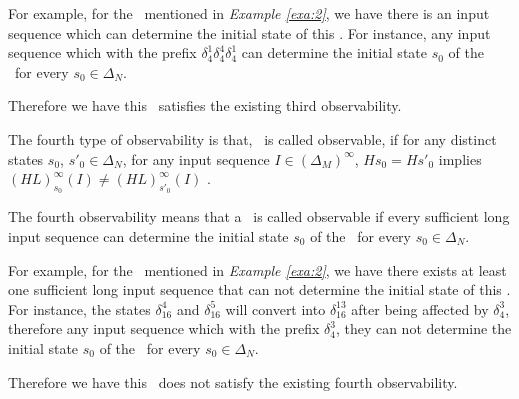 \begin{example}
For example, for the \BCN\ mentioned in {\em Example \ref{exa:2}}, we have there is an input sequence which can determine the initial state of this \BCN.  For instance, any input sequence which with the prefix $\delta_{4}^1\delta_{4}^4\delta_{4}^1$ can determine the initial state $s_0$ of the \BCN\ for every $s_0\in\Delta_N$.

Therefore we have this \BCN\ satisfies the existing third observability.
\end{example}  
\begin{definition}
	The fourth type of observability is that, \BCN\ is called observable, if for any distinct states $s_0$, ${s'}_0 \in \Delta_N$, for any input sequence $I\in(\Delta_M)^{\infty}$, $Hs_0=H{s'}_0$ implies $(HL)^{\infty}_{s_0}(I)\neq (HL)^{\infty}_{{s'}_0}(I)$ \cite{Fornasini2013Observability}.
\end{definition}

The fourth observability means that a \BCN\ is called observable if every sufficient long input sequence can determine the initial state $s_0$ of the \BCN\ for every $s_0\in\Delta_N$.
\begin{example}
For example, for the \BCN\ mentioned in {\em Example \ref{exa:2}}, we have there exists at least one sufficient long input sequence that can not determine the initial state of this \BCN. For instance, the states $\delta_{16}^4$ and $\delta_{16}^5$  will convert into $\delta_{16}^{13}$ after being affected by $\delta_{4}^3$, therefore any input sequence which with the prefix $\delta_{4}^3$, they can not determine the initial state $s_0$ of the \BCN\ for every $s_0\in\Delta_N$.

Therefore we have this \BCN\ does not satisfy the existing fourth observability.
\end{example}  


